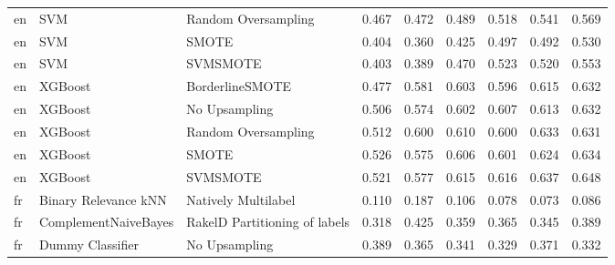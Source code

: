 \begin{tabular}{lllllllll}
      en &                             SVM &           Random Oversampling & 0.467 &                     0.472 &                 0.489 &                  0.518 &                                   0.541 &     0.569 \\
      en &                             SVM &                         SMOTE & 0.404 &                     0.360 &                 0.425 &                  0.497 &                                   0.492 &     0.530 \\
      en &                             SVM &                      SVMSMOTE & 0.403 &                     0.389 &                 0.470 &                  0.523 &                                   0.520 &     0.553 \\
      en &                         XGBoost &               BorderlineSMOTE & 0.477 &                     0.581 &                 0.603 &                  0.596 &                                   0.615 &     0.632 \\
      en &                         XGBoost &                 No Upsampling & 0.506 &                     0.574 &                 0.602 &                  0.607 &                                   0.613 &     0.632 \\
      en &                         XGBoost &           Random Oversampling & 0.512 &                     0.600 &                 0.610 &                  0.600 &                                   0.633 &     0.631 \\
      en &                         XGBoost &                         SMOTE & 0.526 &                     0.575 &                 0.606 &                  0.601 &                                   0.624 &     0.634 \\
      en &                         XGBoost &                      SVMSMOTE & 0.521 &                     0.577 &                 0.615 &                  0.616 &                                   0.637 &     0.648 \\
      fr &            Binary Relevance kNN &           Natively Multilabel & 0.110 &                     0.187 &                 0.106 &                  0.078 &                                   0.073 &     0.086 \\
      fr &            ComplementNaiveBayes & RakelD Partitioning of labels & 0.318 &                     0.425 &                 0.359 &                  0.365 &                                   0.345 &     0.389 \\
      fr &                Dummy Classifier &                 No Upsampling & 0.389 &                     0.365 &                 0.341 &                  0.329 &                                   0.371 &     0.332 \\

\end{tabular}
